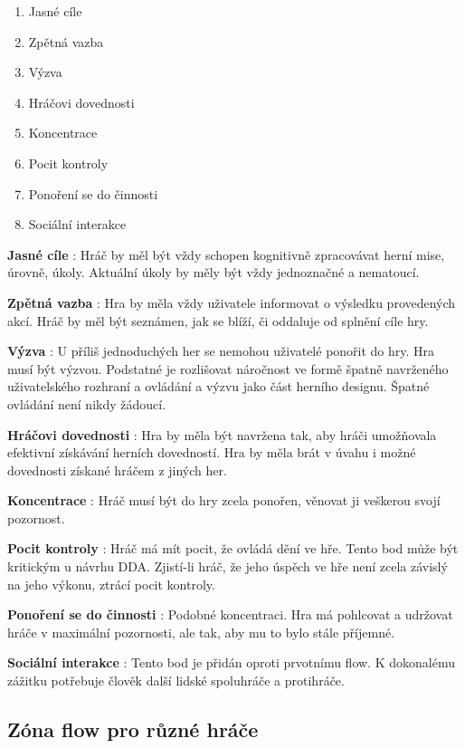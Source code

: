 \begin{enumerate}
  \item Jasné cíle
	\item Zpětná vazba
	\item Výzva
	\item Hráčovi dovednosti
	\item Koncentrace
	\item Pocit kontroly
	\item Ponoření se do činnosti
	\item Sociální interakce
\end{enumerate}

\textbf{Jasné cíle} : 
Hráč by měl být vždy schopen kognitivně zpracovávat herní mise, úrovně, úkoly. Aktuální úkoly by měly být vždy jednoznačné a nematoucí.

\textbf{Zpětná vazba} : 
Hra by měla vždy uživatele informovat o výsledku provedených akcí. Hráč by měl být seznámen, jak se blíží, či oddaluje od splnění cíle hry.

\textbf{Výzva} : 
U příliš jednoduchých her se nemohou uživatelé ponořit do hry. Hra musí být výzvou. Podstatné je rozlišovat náročnost ve formě špatně navrženého uživatelského rozhraní a ovládání a výzvu jako část herního designu. Špatné ovládání není nikdy žádoucí.

\textbf{Hráčovi dovednosti} : 
Hra by měla být navržena tak, aby hráči umožňovala efektivní získávání herních dovedností. Hra by měla brát v úvahu i možné dovednosti získané hráčem z jiných her.

\textbf{Koncentrace} : 
Hráč musí být do hry zcela ponořen, věnovat ji veškerou svojí pozornost.

\textbf{Pocit kontroly} : 
Hráč má mít pocit, že ovládá dění ve hře. Tento bod může být kritickým u návrhu DDA. Zjistí-li hráč, že jeho úspěch ve hře není zcela závislý na jeho výkonu, ztrácí pocit kontroly.

\textbf{Ponoření se do činnosti} : 
Podobné koncentraci. Hra má pohlcovat a udržovat hráče v maximální pozornosti, ale tak, aby mu to bylo stále příjemné.

\textbf{Sociální interakce} : 
Tento bod je přidán oproti prvotnímu flow. K dokonalému zážitku potřebuje člověk další lidské spoluhráče a protihráče.

\subsection{Zóna flow pro různé hráče}

